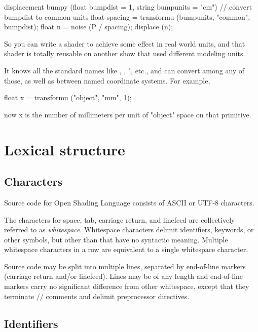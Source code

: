 \documentclass[11pt,letterpaper]{book}
\def\langname{Open Shading Language\xspace}
\def\objectspace{{\cf "object"} space\xspace}
\begin{document}
\begin{code}
    displacement bumpy (float bumpdist = 1,
                        string bumpunits = "cm")
    {
        // convert bumpdist to common units
        float spacing = transformu (bumpunits, "common", bumpdist);
        float n = noise (P / spacing);
        displace (n);
    }
\end{code}

So you can write a shader to achieve some effect in real world units,
and that shader is totally reusable on another show that used different
modeling units.

It knows all the standard names like , , ",
etc., and can convert among any of those, as well as between named
coordinate systems.  For example,

\begin{code}
    float x = transformu ("object", "mm", 1);
\end{code}

now {\cf x} is the number of millimeters per unit of \objectspace on
that primitive.


\chapter{Lexical structure}
\label{chap:lexical}

\section{Characters}
\label{sec:lexical:chars}

Source code for \langname consists of ASCII or UTF-8 characters.

The characters for space, tab, carriage return, and linefeed are
collectively referred to as \emph{whitespace}.  Whitespace characters
delimit identifiers, keywords, or other symbols, but other than that
have no syntactic meaning.  Multiple whitespace characters in a row
are equivalent to a single whitespace character. 

Source code may be split into multiple lines, separated by end-of-line
markers (carriage return and/or linefeed).  Lines may be of any length
and end-of-line markers carry no significant difference from other 
whitespace, except that they terminate {\cf //} comments and delimit
preprocessor directives.

\section{Identifiers}
\label{sec:identifiers}
\end{document}
